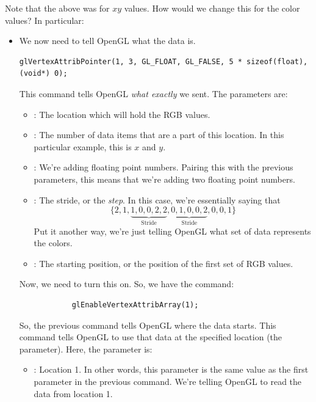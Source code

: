 \documentclass[letterpaper]{article}
\begin{document}
\begin{enumerate}
    Note that the above was for $xy$ values. How would we change this for the color values? In particular: 
    \begin{itemize}
        \item We now need to tell OpenGL what the data is. 
        \begin{verbatim}
glVertexAttribPointer(1, 3, GL_FLOAT, GL_FALSE, 5 * sizeof(float), (void*) 0);\end{verbatim}
        This command tells OpenGL \emph{what exactly} we sent. The parameters are: 
        \begin{itemize}
            \item {}: The location which will hold the RGB values.
            \item {}: The number of data items that are a part of this location. In this particular example, this is $x$ and $y$.
            \item {}: We're adding floating point numbers. Pairing this with the previous parameters, this means that we're adding two floating point numbers. 
            \item {}: The stride, or the \emph{step}. In this case, we're essentially saying that 
            \[\{2, 1, \underbrace{1, 0, 0, 2, 2}_{\text{Stride}}, \underbrace{0, 1, 0, 0, 2}_{\text{Stride}}, 0, 0, 1\}\]
            Put it another way, we're just telling OpenGL what set of data represents the colors.
            \item  {}: The starting position, or the position of the first set of RGB values.
        \end{itemize}
        Now, we need to turn this on. So, we have the command: 
        \begin{verbatim}
            glEnableVertexAttribArray(1);
        \end{verbatim}
        So, the previous command tells OpenGL where the data starts. This command tells OpenGL to use that data at the specified location (the parameter). Here, the parameter is: 
        \begin{itemize}
            \item {}: Location 1. In other words, this parameter is the same value as the first parameter in the previous command. We're telling OpenGL to read the data from location 1.
        \end{itemize}
    \end{itemize}


\end{enumerate}
\end{document}
